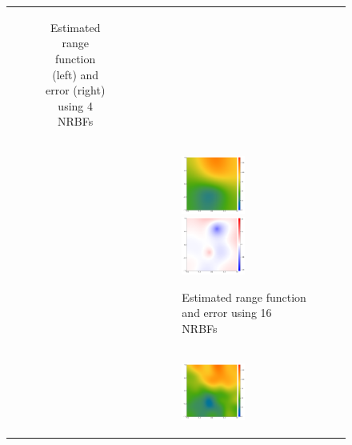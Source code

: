 \documentclass{article}
\numberwithin{equation}{section}
\begin{document}
\begin{figure}[t!]
\begin{tabular}{ccc}
{\begin{subfigure}[t]{0.6\textwidth}
        \caption{Estimated range function (left) and error (right) using 4 NRBFs}
      \end{subfigure}
    } \\[4ex]
    &
    \multicolumn{2}{l}{
      \begin{subfigure}[t]{0.6\textwidth}
        \includegraphics[width=0.5\textwidth]{figures/isotropic/est-nsr-p10000-a16.pdf}%
        \includegraphics[width=0.5\textwidth]{figures/isotropic/err-nsr-p10000-a16.pdf}
        \caption{Estimated range function and error using 16 NRBFs}
      \end{subfigure}
    } \\[4ex]
    &
    \multicolumn{2}{l}{
      \begin{subfigure}[t]{0.6\textwidth}
        \includegraphics[width=0.5\textwidth]{figures/isotropic/est-nsr-p10000-a64.pdf}%

\end{subfigure}}
\end{tabular}
\end{figure}
\end{document}
